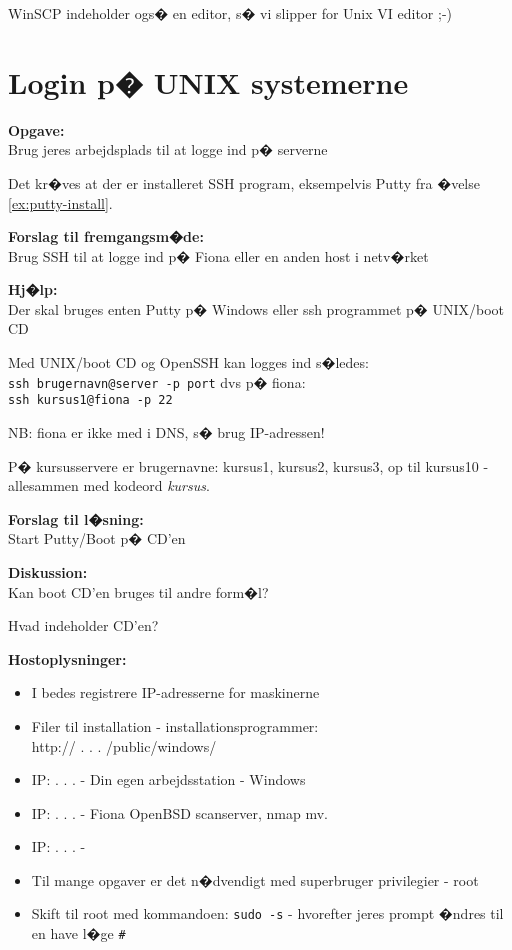 \documentclass[a4paper,11pt,notitlepage]{oevelser}
\begin{document}
WinSCP indeholder ogs� en editor, s� vi slipper for Unix VI editor ;-)

\chapter{Login p� UNIX systemerne}
\label{ex:unix-login}

{\bfseries Opgave:}\\
Brug jeres arbejdsplads til at logge ind p� serverne

Det kr�ves at der er installeret SSH program, eksempelvis Putty fra
�velse \ref{ex:putty-install}.

{\bfseries Forslag til fremgangsm�de:}\\
Brug SSH til at logge ind p� Fiona eller en anden host i netv�rket

{\bfseries Hj�lp:}\\
Der skal bruges enten Putty p� Windows eller ssh programmet p� UNIX/boot CD

Med UNIX/boot CD og OpenSSH kan logges ind s�ledes:\\
\verb+ssh brugernavn@server -p port+ dvs p� fiona:\\
\verb+ssh kursus1@fiona -p 22+

NB: fiona er ikke med i DNS, s� brug IP-adressen!

P� kursusservere er brugernavne: kursus1, kursus2, kursus3, op til
kursus10 - allesammen med kodeord \emph{kursus}.


{\bfseries Forslag til l�sning:}\\
Start Putty/Boot p� CD'en

{\bfseries Diskussion:}\\
Kan boot CD'en bruges til andre form�l?

Hvad indeholder CD'en?

{\bfseries Hostoplysninger:}\\

\begin{itemize}
\item I bedes registrere IP-adresserne for maskinerne
\item Filer til installation - installationsprogrammer:\\
http:// \hskip 15mm .\hskip 15mm .\hskip 15mm .\hskip 15mm /public/windows/
\item IP: \hskip 15mm .\hskip 15mm .\hskip 15mm .\hskip 15mm - Din egen
  arbejdsstation - Windows
\item IP: \hskip 15mm .\hskip 15mm .\hskip 15mm .\hskip 15mm - Fiona
  OpenBSD scanserver, nmap mv.
\item IP: \hskip 15mm .\hskip 15mm .\hskip 15mm .\hskip 15mm -
\item Til mange opgaver er det n�dvendigt med superbruger privilegier
  - root
\item Skift til root med kommandoen: \verb+sudo -s+ - hvorefter jeres
  prompt �ndres til en have l�ge \verb+#+
\end{itemize}
\end{document}
